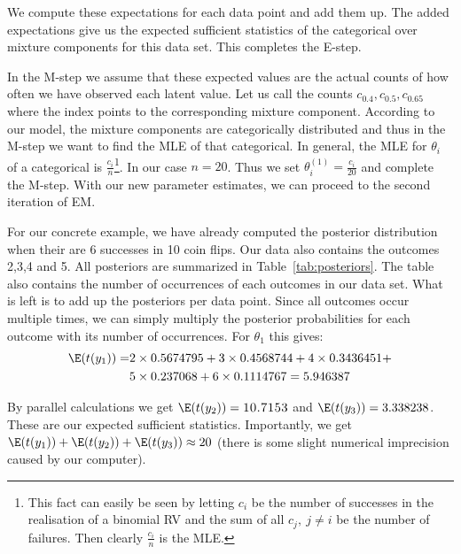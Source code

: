 We compute these expectations for each data point and add them up. The added expectations give
us the expected sufficient statistics of the categorical over mixture components for this data set.
This completes the E-step.

In the M-step we assume that these expected values are the actual counts of how often we have observed each latent value. Let us call the counts 
$ c_{0.4}, c_{0.5}, c_{0.65} $ where the index points to the corresponding mixture component. According to our model, the mixture components are categorically
distributed and thus in the M-step we want to find the MLE of that categorical. In general, the MLE for $ \theta_{i} $ of a categorical is
$ \frac{c_{i}}{n} $\footnote{This fact can easily be seen by letting $ c_{i} $ be the number of successes in the realisation of a binomial RV and the sum of all
$ c_{j},~j \not = i $ be the number of failures. Then clearly $ \frac{c_{i}}{n} $ is the MLE.}. In our case $ n=20 $. Thus we set 
$ \theta_{i}^{(1)} = \frac{c_{i}}{20} $ and complete the M-step. With our new parameter estimates, we can proceed to the second iteration of EM.

For our concrete example, we have already computed the posterior distribution when their are 6 successes
in 10 coin flips. Our data also contains the outcomes 2,3,4 and 5. All posteriors are summarized in 
Table~\eqref{tab:posteriors}. The table also contains the number of occurrences of each outcomes in our
data set. What is left is to add up the posteriors per data point. Since all outcomes occur multiple
times, we can simply multiply the posterior probabilities for each outcome with its number of occurrences.
For $ \theta_{1} $ this gives:
\begin{align}
\E(t(y_{1})) = &2 \times 0.5674795 + 3 \times 0.4568744 + 4 \times 0.3436451 + \\
&5 \times 0.237068 + 6 \times 0.1114767 = 5.946387 \nonumber
\end{align}

By parallel calculations we get $ \E(t(y_{2})) = \textsc{10.7153} $ and $ \E(t(y_{3})) = 3.338238 $. 
These are our expected sufficient statistics. Importantly, we get 
$ \E(t(y_{1})) + \E(t(y_{2})) + \E(t(y_{3})) \approx 20 $ (there is some slight numerical imprecision
caused by our computer). 

\begin{knitrout}
\color{fgcolor}\begin{kframe}


{\ttfamily\noindent\bfseries{}}\end{kframe}
\end{knitrout}

